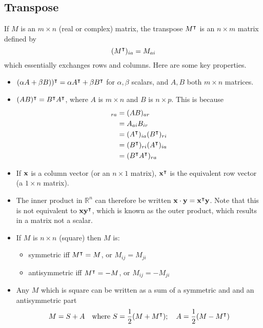 \subsection{Transpose}
If \(M\) is an \(m \times n\) (real or complex) matrix, the transpose \(M^\intercal\) is an \(n \times m\) matrix defined by
\[ (M^\intercal)_{ia} = M_{ai} \]
which essentially exchanges rows and columns. Here are some key properties.
\begin{itemize}
	\item \((\alpha A + \beta B))^\intercal = \alpha A^\intercal + \beta B^\intercal\) for \(\alpha, \beta\) scalars, and \(A, B\) both \(m \times n\) matrices.
	\item \((AB)^\intercal = B^\intercal A^\intercal\), where \(A\) is \(m \times n\) and \(B\) is \(n \times p\). This is because
	      \begin{align*}
		      [(AB)^\transpose]_{ra} & = (AB)_{ar}                               \\
		                             & = A_{ai} B_{ir}                           \\
		                             & = (A^\transpose)_{ia} (B^\transpose)_{ri} \\
		                             & = (B^\transpose)_{ri} (A^\transpose)_{ia} \\
		                             & = (B^\transpose A^\transpose)_{ra}
	      \end{align*}
	\item If \(\vb x\) is a column vector (or an \(n \times 1\) matrix), \(\vb x^\intercal\) is the equivalent row vector (a \(1 \times n\) matrix).
	\item The inner product in \(\mathbb R^n\) can therefore be written \(\vb x \cdot \vb y = \vb x^\intercal \vb y\). Note that this is not equivalent to \(\vb x \vb y^\intercal\), which is known as the outer product, which results in a matrix not a scalar.
	\item If \(M\) is \(n \times n\) (square) then \(M\) is:
	      \begin{itemize}
		      \item symmetric iff \(M^\intercal = M\), or \(M_{ij} = M_{ji}\)
		      \item antisymmetric iff \(M^\intercal = -M\), or \(M_{ij} = -M_{ji}\)
	      \end{itemize}
	\item Any \(M\) which is square can be written as a sum of a symmetric and and an antisymmetric part
	      \[ M = S + A\quad\text{where } S = \frac{1}{2}(M + M^\intercal);\quad A = \frac{1}{2}(M - M^\intercal) \]

\end{itemize}
